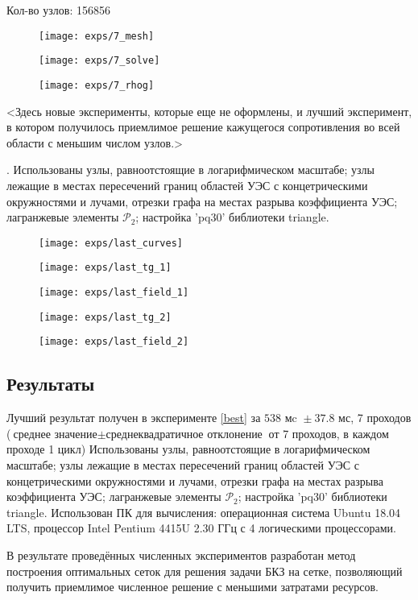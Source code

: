 Кол-во узлов: 156856

\begin{figure}[H]
  \texttt{[image: exps/7\_mesh]}
\end{figure}
\begin{figure}[H]
  \texttt{[image: exps/7\_solve]}
\end{figure}
\begin{figure}[H]
  \texttt{[image: exps/7\_rhog]}
\end{figure}

<Здесь новые эксперименты, которые еще не оформлены,
и лучший эксперимент, в котором получилось приемлимое решение кажущегося сопротивления во всей области
с меньшим числом узлов.>

 \theexp \label{best}.
Использованы узлы, равноотстоящие в логарифмическом масштабе;
узлы лежащие в местах пересечений границ областей УЭС с концетрическими окружностями и лучами,
отрезки графа на местах разрыва коэффициента УЭС; лагранжевые элементы $\mathcal{P}_2$; настройка 'pq30' библиотеки triangle.

\begin{figure}[H]
\texttt{[image: exps/last\_curves]}
\caption{}
\end{figure}

\begin{figure}[H]
\centering
\texttt{[image: exps/last\_tg\_1]}
\caption{}
\end{figure}

\begin{figure}[H]
\centering
\texttt{[image: exps/last\_field\_1]}
\caption{}
\end{figure}

\begin{figure}[H]
\texttt{[image: exps/last\_tg\_2]}
\caption{}
\end{figure}

\begin{figure}[H]
\texttt{[image: exps/last\_field\_2]}
\caption{}
\end{figure}


\subsection{Результаты}

Лучший результат получен в эксперименте \ref{best} за $538 \text{ мc } \pm 37.8 \text{ мс}$, 7 проходов
($\text{среднее значение} \pm \text{среднеквадратичное отклонение}$ от 7 проходов, в каждом проходе 1 цикл)
Использованы узлы, равноотстоящие в логарифмическом масштабе;
узлы лежащие в местах пересечений границ областей УЭС с концетрическими окружностями и лучами,
отрезки графа на местах разрыва коэффициента УЭС; лагранжевые элементы $\mathcal{P}_2$; настройка 'pq30' библиотеки triangle.
Использован ПК для вычисления: операционная система Ubuntu 18.04 LTS, процессор Intel Pentium 4415U 2.30 ГГц с 4 логическими процессорами.

В результате проведённых численных экспериментов разработан метод построения оптимальных сеток
для решения задачи БКЗ на сетке, позволяющий получить приемлимое численное решение с меньшими затратами ресурсов.

\clearpage